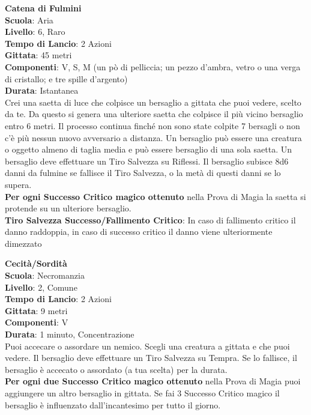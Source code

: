 \begin{multicols}{2}
\medskip\textbf{Catena di Fulmini}\\
\textbf{Scuola}: Aria\\
\textbf{Livello}: 6, Raro\\
\textbf{Tempo di Lancio}: 2 Azioni\\
\textbf{Gittata}: 45 metri\\
\textbf{Componenti}: V, S, M (un pò di pelliccia; un pezzo d'ambra, vetro o una verga di cristallo; e tre spille d'argento)\\
\textbf{Durata}: Istantanea\\
Crei una saetta di luce che colpisce un bersaglio a gittata che puoi vedere, scelto da te. Da questo si genera una ulteriore saetta che colpisce il più vicino bersaglio entro 6 metri. Il processo continua finché non sono state colpite 7 bersagli o non c'è più nessun nuovo avversario a distanza. Un bersaglio può essere una creatura o oggetto almeno di taglia media e può essere bersaglio di una sola saetta. Un bersaglio deve effettuare un Tiro Salvezza su Riflessi. Il bersaglio subisce 8d6 danni da fulmine se fallisce il Tiro Salvezza, o la metà di questi danni se lo supera.\\
\textbf{Per ogni Successo Critico magico ottenuto} nella Prova di Magia la saetta si protende su un ulteriore bersaglio.\\
\textbf{Tiro Salvezza Successo/Fallimento Critico}: In caso di fallimento critico il danno raddoppia, in caso di successo critico il danno viene ulteriormente dimezzato

\medskip\textbf{Cecità/Sordità}\\
\textbf{Scuola}: Necromanzia\\
\textbf{Livello}: 2, Comune\\
\textbf{Tempo di Lancio}: 2 Azioni\\
\textbf{Gittata}: 9 metri\\
\textbf{Componenti}: V\\
\textbf{Durata}: 1 minuto, Concentrazione\\
Puoi accecare o assordare un nemico. Scegli una creatura a gittata e che puoi vedere. Il bersaglio deve effettuare un Tiro Salvezza su Tempra. Se lo fallisce, il bersaglio è accecato o assordato (a tua scelta) per la durata.\\
\textbf{Per ogni due Successo Critico magico ottenuto} nella Prova di Magia puoi aggiungere un altro bersaglio in gittata. Se fai 3 Successo Critico magico il bersaglio è influenzato dall'incantesimo per tutto il giorno.


\end{multicols}
